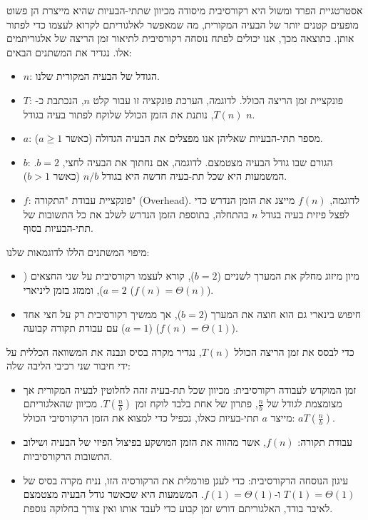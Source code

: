 \documentclass[11pt, a4paper]{article}
\begin{document}
אסטרטגיית הפרד ומשול היא רקורסיבית מיסודה מכיוון שתתי-הבעיות שהיא מייצרת הן פשוט מופעים קטנים יותר של הבעיה המקורית, מה שמאפשר לאלגוריתם לקרוא לעצמו כדי לפתור אותן. כתוצאה מכך, אנו יכולים לפתח נוסחה רקורסיבית לתיאור זמן הריצה של אלגוריתמים אלו. נגדיר את המשתנים הבאים:
\begin{itemize}
    \item $n$: הגודל של הבעיה המקורית שלנו.
    \item $T$: פונקציית זמן הריצה הכולל. לדוגמה, הערכת פונקציה זו עבור קלט $n$, הנכתבת כ-$T(n)$, נותנת את הזמן הכולל שלוקח לפתור בעיה בגודל $n$.
    \item $a$: מספר תתי-הבעיות שאליהן אנו מפצלים את הבעיה הגדולה (כאשר $a \ge 1$).
    \item $b$: הגורם שבו גודל הבעיה מצטמצם. לדוגמה, אם נחתוך את הבעיה לחצי, $b = 2$. המשמעות היא שכל תת-בעיה חדשה היא בגודל $n/b$ (כאשר $b > 1$).
    \item $f$: פונקציית עבודת "התקורה" (\textenglish{Overhead}). לדוגמה, $f(n)$ מייצג את הזמן הנדרש כדי לפצל פיזית בעיה בגודל $n$ בהתחלה, בתוספת הזמן הנדרש לשלב את כל התשובות של תתי-הבעיות בסוף.
\end{itemize}

מיפוי המשתנים הללו לדוגמאות שלנו:
\begin{itemize}
    \item מיון מיזוג מחלק את המערך לשניים ($b=2$), קורא לעצמו רקורסיבית על שני החצאים ($a=2$), וממזג בזמן ליניארי ($f(n) = \Theta(n)$).

    \item חיפוש בינארי גם הוא חוצה את המערך ($b=2$), אך ממשיך רקורסיבית רק על חצי אחד ($a=1$) עם עבודת תקורה קבועה ($f(n) = \Theta(1)$).
\end{itemize}


כדי לבסס את זמן הריצה הכולל $T(n)$, נגדיר מקרה בסיס ונבנה את המשוואה הכללית על ידי חיבור שני רכיבי הליבה שלה:

\begin{itemize}
    \item זמן המוקדש לעבודה רקורסיבית: מכיוון שכל תת-בעיה זהה לחלוטין לבעיה המקורית אך מצומצמת לגודל של $\frac{n}{b}$, פתרון של אחת בלבד לוקח זמן $T\left(\frac{n}{b}\right)$. מכיוון שהאלגוריתם מייצר $a$ תתי-בעיות כאלו, נכפיל כדי למצוא את הזמן הרקורסיבי הכולל: $aT\left(\frac{n}{b}\right)$.

    \item עבודת תקורה: $f(n)$, אשר מהווה את הזמן המושקע בפיצול הפיזי של הבעיה ושילוב התשובות הרקורסיביות.

    \item עיגון הנוסחה הרקורסיבית: כדי לעגן פורמלית את הרקורסיה הזו, נניח מקרה בסיס של $T(1) = \Theta(1)$ ו-$f(1) = \Theta(1)$. המשמעות היא שכאשר גודל הבעיה מצטמצם לאיבר בודד, האלגוריתם דורש זמן קבוע כדי לעבד אותו ואין צורך בחלוקה נוספת.
\end{itemize}
\end{document}
